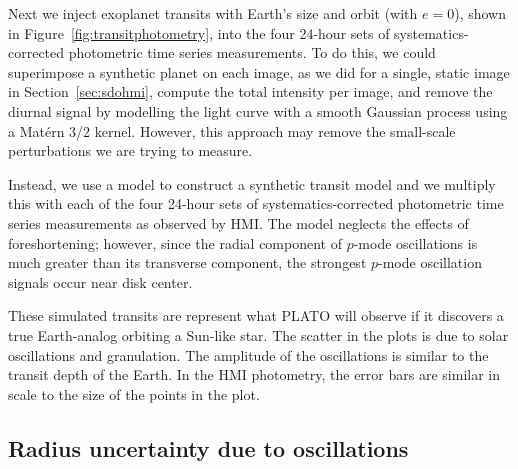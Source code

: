 Next we inject exoplanet transits with Earth's size and orbit (with $e=0$), shown in Figure~\ref{fig:transitphotometry}, into the four 24-hour sets of systematics-corrected photometric time series measurements. To do this, we could superimpose a synthetic planet on each image, as we did for a single, static image in Section~\ref{sec:sdohmi}, compute the total intensity per image, and remove the diurnal signal by modelling the light curve with a smooth Gaussian process using a Mat{\'e}rn 3/2 kernel. However, this approach may remove the small-scale perturbations we are trying to measure.

Instead, we use a model to construct a synthetic \citep{Mandel2002} transit model and we multiply this with each of the four 24-hour sets of systematics-corrected photometric time series measurements as observed by HMI. The model neglects the effects of foreshortening; however, since the radial component of $p$-mode oscillations is much greater than its transverse component, the strongest $p$-mode oscillation signals occur near disk center.

These simulated transits are represent what PLATO will observe if it discovers a true Earth-analog orbiting a Sun-like star. The scatter in the plots is due to solar oscillations and granulation. The amplitude of the oscillations is similar to the transit depth of the Earth. In the HMI photometry, the error bars are similar in scale to the size of the points in the plot. 
 
\subsection{Radius uncertainty due to oscillations} \label{sec:gp2}

